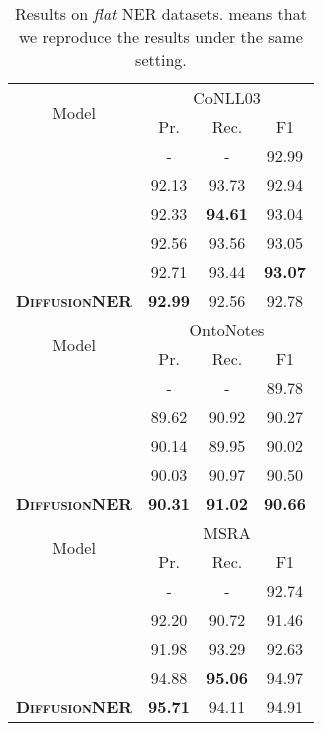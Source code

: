 \documentclass[11pt]{article}
\begin{document}
\begin{table}[]
\centering
\small
\begin{tabular}{lccc}
\toprule
\multicolumn{1}{c}{\multirow{2}{*}{Model}}   & \multicolumn{3}{c}{CoNLL03}  \\

 \cmidrule(lr){2-4} 
&  Pr.  & Rec. & F1 \\
\midrule
\citet{lu-etal-2022-unified} & - & -  & 92.99  \\
\citet{shen-etal-2021-locate} & 92.13 & {93.73} & 92.94  \\
\citet{li-etal-2020-unified} & 92.33 & \textbf{94.61} & 93.04 \\
\citet{yan-etal-2021-unified-generative} & 92.56 & 93.56 & 93.05  \\
\citet{li2022unified} & 92.71 & 93.44 & \textbf{93.07}  \\
\midrule
\textbf{\textsc{DiffusionNER}} & \textbf{92.99} & 92.56 & 92.78  \\
\toprule
\multicolumn{1}{c}{\multirow{2}{*}{Model}}    & \multicolumn{3}{c}{OntoNotes}    \\

 \cmidrule(lr){2-4}  
&  Pr.  & Rec. & F1   \\
\midrule
\citet{https://doi.org/10.48550/arxiv.1911.04474} & -  & -  & 89.78\\
\citet{yan-etal-2021-unified-generative}  & 89.62 & 90.92 & 90.27 \\
\citet{li-etal-2020-unified} & {90.14} & 89.95 & {90.02}  \\
\citet{li2022unified} &{90.03} & 90.97 & {90.50}  \\
\midrule
\textbf{\textsc{DiffusionNER}} & \textbf{90.31} & \textbf{91.02} & \textbf{90.66}  \\

\toprule
\multicolumn{1}{c}{\multirow{2}{*}{Model}}    & \multicolumn{3}{c}{MSRA}    \\

 \cmidrule(lr){2-4}  
&  Pr.  & Rec. & F1   \\
\midrule
\citet{https://doi.org/10.48550/arxiv.1911.04474} & -  & -  & 92.74  \\
\citet{shen-etal-2021-locate} &  92.20 & 90.72 & 91.46  \\
\citet{li-etal-2020-unified} & 91.98 & 93.29 & 92.63 \\

\citet{li2022unified} & {94.88} & \textbf{95.06} & {94.97} \\
\midrule
\textbf{\textsc{DiffusionNER}} & \textbf{95.71} & 94.11 & 94.91 \\
\bottomrule
\end{tabular}
\caption{Results on \textit{flat} NER datasets.  means that we reproduce the results under the same setting.}
\label{tab:flat}
\end{table}
\end{document}
